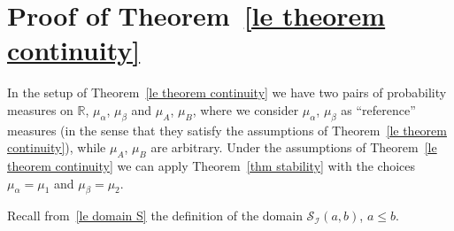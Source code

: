 \documentclass[10pt,reqno]{amsart}
\numberwithin{equation}{section}
\theoremstyle{plain}
\numberwithin{kevin}{section}
\theoremstyle{remark}
\newcommand{\R}{{\mathbb R }}
\begin{document}
 
\section{Proof of Theorem~\ref{le theorem continuity}}\label{section theorem continuity}
In the setup of Theorem~\ref{le theorem continuity} we have two pairs of probability measures on $\R$, $\mu_\alpha$, $\mu_\beta$ and $\mu_A$, $\mu_B$, where we consider $\mu_\alpha$, $\mu_\beta$ as ``reference'' measures (in the sense that they satisfy the assumptions of Theorem~\ref{le theorem continuity}), while $\mu_A$, $\mu_B$ are arbitrary. Under the assumptions of Theorem~\ref{le theorem continuity} we can apply Theorem~\ref{thm stability} with the choices $\mu_\alpha=\mu_1$ and $\mu_\beta=\mu_2$.

Recall from~\eqref{le domain S} the definition of the domain $\mathcal{S}_{\mathcal{I}}(a,b)$, $a\le b$.
\end{document}
